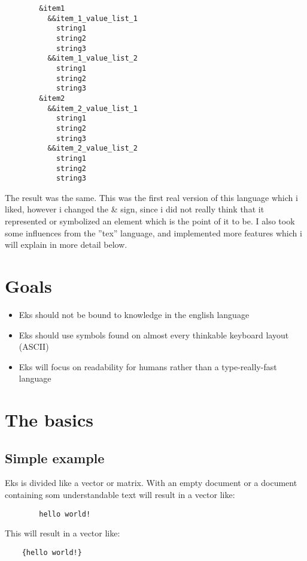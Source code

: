 \documentclass{book}
\begin{document}
	\begin{verbatim}
		&item1
		  &&item_1_value_list_1
		    string1
		    string2
		    string3
		  &&item_1_value_list_2
		    string1
		    string2
		    string3
		&item2
		  &&item_2_value_list_1
		    string1
		    string2
		    string3
		  &&item_2_value_list_2
		    string1
		    string2
		    string3
	\end{verbatim}
	
	The result was the same. This was the first real version of this language which i liked, however i changed the \& sign, since i did not really think that it represented or symbolized an element which is the point of it to be.
	I also took some influences from the ''tex'' language, and implemented more features which i will explain in more detail below.
	
	\chapter{Goals}
	
	\begin{itemize}
		\item Eks should not be bound to knowledge in the english language
		\item Eks should use symbols found on almost every thinkable keyboard layout (ASCII)
		\item Eks will focus on readability for humans rather than a type-really-fast language
	\end{itemize}
	
	\chapter{The basics}
	
	\section{Simple example}
	
	Eks is divided like a vector or matrix. With an empty document or a document containing som understandable text will result in a vector like:
	
	\begin{verbatim}
		hello world!
	\end{verbatim}
	
	This will result in a vector like:
	
	\begin{verbatim}
	{hello world!}
	\end{verbatim}
	
\end{document}
